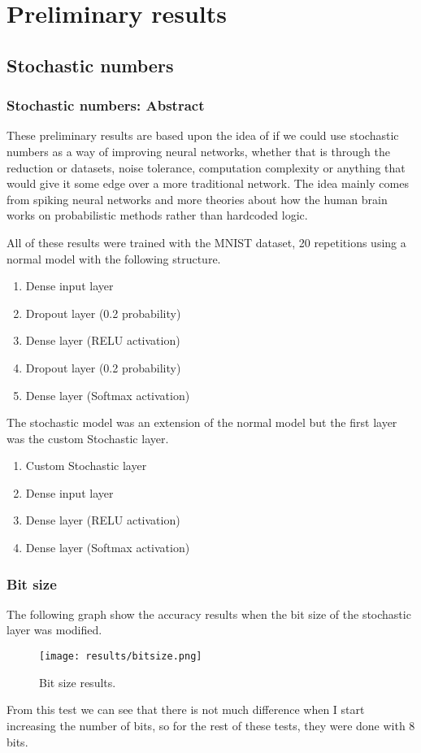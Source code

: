 \documentclass[a4paper,oneside,phd,etd]{BYUPhys}
\begin{document}
\chapter{Preliminary results}
\section{Stochastic numbers}
\subsection{Stochastic numbers: Abstract}
These preliminary results are based upon the idea of if we could use stochastic numbers as a way of improving neural networks, whether that is through the reduction or datasets, noise tolerance, computation complexity or anything that would give it some edge over a more traditional network.
The idea mainly comes from spiking neural networks and more theories about how the human brain works on probabilistic methods rather than hardcoded logic.

All of these results were trained with the MNIST dataset, 20 repetitions using a normal model with the following structure.
\begin{enumerate}
    \itemsep0em
    \item Dense input layer
    \item Dropout layer (0.2 probability)
    \item Dense layer (RELU activation)
    \item Dropout layer (0.2 probability)
    \item Dense layer (Softmax activation)
\end{enumerate}
The stochastic model was an extension of the normal model but the first layer was the custom Stochastic layer.
\begin{enumerate}
    \itemsep0em
    \item Custom Stochastic layer
    \item Dense input layer
    \item Dense layer (RELU activation)
    \item Dense layer (Softmax activation)
\end{enumerate}

\subsection{Bit size}
The following graph show the accuracy results when the bit size of the stochastic layer was modified.
\begin{figure}[H]
\centering
\texttt{[image: results/bitsize.png]}
\caption{Bit size results.}
\label{fig:bitsize}
\end{figure}
From this test we can see that there is not much difference when I start increasing the number of bits, so for the rest of these tests, they were done with 8 bits.
\end{document}
